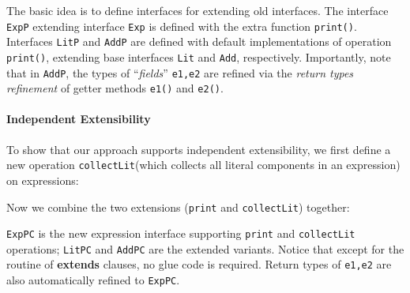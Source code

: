 
The basic idea is to define interfaces for extending old interfaces.  The
interface \texttt{ExpP} extending interface \texttt{Exp} is defined with the
extra function \texttt{print()}. Interfaces \texttt{LitP} and \texttt{AddP} are
defined with default implementations of operation \texttt{print()}, extending
base interfaces \texttt{Lit} and \texttt{Add}, respectively. Importantly, note
that in \texttt{AddP}, the types of ``\emph{fields}'' \texttt{e1,e2} are refined
via the \emph{return types refinement} of getter methods \texttt{e1()} and
\texttt{e2()}.

\paragraph{Independent Extensibility}
To show that our approach supports independent extensibility, we first define a
new operation \texttt{collectLit}(which collects all
literal components in an expression) on expressions: 


\noindent Now we combine the two extensions (\texttt{print} and
\texttt{collectLit}) together:


\noindent \texttt{ExpPC} is the new expression interface supporting
\texttt{print} and \texttt{collectLit} operations; \texttt{LitPC} and
\texttt{AddPC} are the extended variants. Notice that except for the routine of
\textbf{extends} clauses, no glue code is required. Return types of
\texttt{e1,e2} are also automatically refined to \texttt{ExpPC}.

